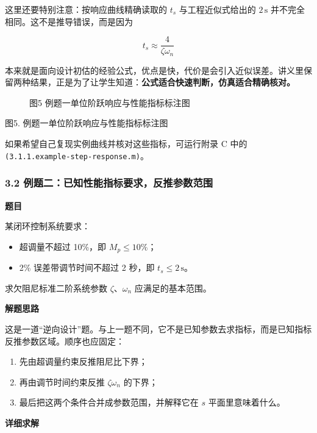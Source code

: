 \documentclass[
  11pt]{article}
\providecommand{\tightlist}{%
  \setlength{\itemsep}{0pt}\setlength{\parskip}{0pt}}
\begin{document}
这里还要特别注意：按响应曲线精确读取的 \(t_s\) 与工程近似式给出的
\(2\,\text{s}\) 并不完全相同。这不是推导错误，而是因为

\[
t_s \approx \frac{4}{\zeta\omega_n}
\]

本来就是面向设计初估的经验公式，优点是快，代价是会引入近似误差。讲义里保留两种结果，正是为了让学生知道：\textbf{公式适合快速判断，仿真适合精确核对。}

\begin{figure}
\centering

\caption{图5 例题一单位阶跃响应与性能指标标注图}
\end{figure}

图5. 例题一单位阶跃响应与性能指标标注图

如果希望自己复现实例曲线并核对这些指标，可运行附录 C 中的
\texttt{(3.1.1.example-step-response.m)}。

\subsubsection{3.2
例题二：已知性能指标要求，反推参数范围}\label{ux4f8bux9898ux4e8cux5df2ux77e5ux6027ux80fdux6307ux6807ux8981ux6c42ux53cdux63a8ux53c2ux6570ux8303ux56f4}

\textbf{题目}

某闭环控制系统要求：

\begin{itemize}
\tightlist
\item
  超调量不超过 10\%，即 \(M_p \le 10\%\)；
\item
  2\% 误差带调节时间不超过 2 秒，即 \(t_s \le 2\,\text{s}\)。
\end{itemize}

求欠阻尼标准二阶系统参数 \(\zeta\)、\(\omega_n\) 应满足的基本范围。

\textbf{解题思路}

这是一道``逆向设计''题。与上一题不同，它不是已知参数去求指标，而是已知指标反推参数区域。顺序也应固定：

\begin{enumerate}
\def\labelenumi{\arabic{enumi}.}
\tightlist
\item
  先由超调量约束反推阻尼比下界；
\item
  再由调节时间约束反推 \(\zeta\omega_n\) 的下界；
\item
  最后把这两个条件合并成参数范围，并解释它在 \(s\) 平面里意味着什么。
\end{enumerate}

\textbf{详细求解}
\end{document}
